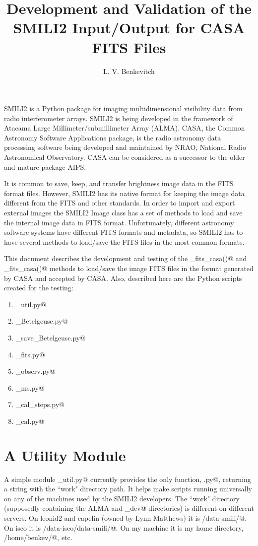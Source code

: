 \documentclass[preprint]{aastex}
\begin{document}
\title{Development and Validation of the SMILI2 Input/Output for CASA FITS Files}

\author{L. V. Benkevitch}

SMILI2 is a Python package for imaging multidimensional visibility data from radio interferometer arrays. SMILI2 is being developed in the framework of Atacama Large Millimeter/submillimeter Array (ALMA). CASA, the Common Astronomy Software Applications package, is the radio astronomy data processing software being developed and maintained by NRAO, National Radio Astronomical Observatory. CASA can be considered as a successor to the older and mature package AIPS. 

It is common to save, keep, and transfer brightness image data in the FITS format files. However, SMILI2 has its native format for keeping the image data different from the FITS and other standards. In order to import and export external images the SMILI2 Image class has a set of methods to load and save the internal image data in FITS format. Unfortunately, different astronomy software systems have different FITS formats and metadata, so SMILI2 has to have several methods to load/save the FITS files in the most common formats.

This document describes the development and testing of the \verb@load_fits_casa()@ and \verb@to_fits_casa()@ methods to load/save the image FITS files in the format generated by CASA and accepted by CASA. Also, described here are the Python scripts created for the testing: 

\begin{enumerate}
  \item \verb@alma_util.py@
  \item \verb@RoundSpottyDisk_Betelgeuse.py@
  \item \verb@load_save_Betelgeuse.py@
  \item \verb@diff_fits.py@
  \item \verb@sim_observ.py@
  \item \verb@diff_ms.py@
  \item \verb@self_cal_steps.py@
  \item \verb@diff_cal.py@
\end{enumerate}


\section{A Utility Module}

A simple module \verb@alma_util.py@ currently provides the only function, \verb@workdir.py@, returning a string with the ``work" directory path. It helps make scripts running universally on any of the machines used by the SMILI2 developers. The ``work" directory (supposedly containing the ALMA and _dev@ directories) is different on different servers. On leonid2 and capelin (owned by Lynn Matthews) it is \verb@/data-smili/@. On isco it is \verb@/data-isco/data-smili/@. On my machine it is my home directory, \verb@/home/benkev/@, etc. 
\end{document}
